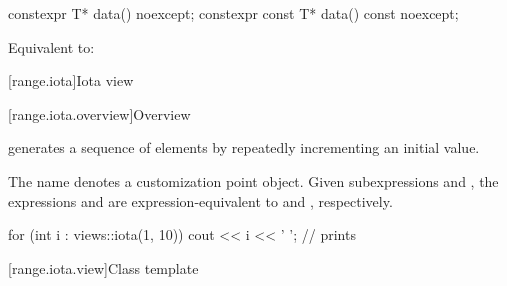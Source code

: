 %
\begin{itemdecl}
constexpr T* data() noexcept;
constexpr const T* data() const noexcept;
\end{itemdecl}

\begin{itemdescr}
\pnum
\effects
Equivalent to: 
\end{itemdescr}

[range.iota]{Iota view}

[range.iota.overview]{Overview}

\pnum
{} generates a
sequence of elements by repeatedly incrementing an initial value.

\pnum
{}%
The name  denotes a
customization point object.
Given subexpressions  and , the expressions
 and 
are expression-equivalent to
 and , respectively.

\pnum
\begin{example}
\begin{codeblock}
for (int i : views::iota(1, 10))
  cout << i << ' '; // prints 
\end{codeblock}
\end{example}

[range.iota.view]{Class template }

